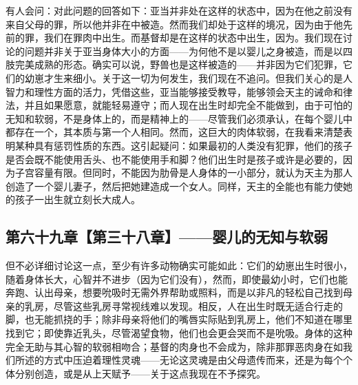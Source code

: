 有人会问：对此问题的回答如下：亚当并非处在这样的状态中，因为在他之前没有来自父母的罪，所以他并非在中被造。然而我们却处于这样的境况，因为由于他先前的罪，我们在罪肉中出生。而基督却是在这样的状态中出生，因为。我们现在讨论的问题并非关于亚当身体大小的方面——为何他不是以婴儿之身被造，而是以四肢完美成熟的形态。确实可以说，野兽也是这样被造的——并非因为它们犯罪，它们的幼崽才生来细小。关于这一切为何发生，我们现在不追问。但我们关心的是人智力和理性方面的活力，凭借这些，亚当能够接受教导，能够领会天主的诫命和律法，并且如果愿意，就能轻易遵守；而人现在出生时却完全不能做到，由于可怕的无知和软弱，不是身体上的，而是精神上的——尽管我们必须承认，在每个婴儿中都存在一个，其本质与第一个人相同。然而，这巨大的肉体软弱，在我看来清楚表明某种具有惩罚性质的东西。这引起疑问：如果最初的人类没有犯罪，他们的孩子是否会既不能使用舌头、也不能使用手和脚？他们出生时是孩子或许是必要的，因为子宫容量有限。但同时，不能因为肋骨是人身体的一小部分，就认为天主为那人创造了一个婴儿妻子，然后把她建造成一个女人。同样，天主的全能也有能力使她的孩子一出生就立刻长大成人。\par


\subsection{第六十九章【第三十八章】——婴儿的无知与软弱}

但不必详细讨论这一点，至少有许多动物确实可能如此：它们的幼崽出生时很小，随着身体长大，心智并不进步（因为它们没有），然而，即使最幼小时，它们也能奔跑、认出母亲，想要吮吸时无需外界帮助或照料，而是以非凡的轻松自己找到母亲的乳房，尽管这些乳房寻常视线难以发现。相反，人在出生时既无适合行走的脚，也无能抓挠的手；除非母亲将他们的嘴唇实际贴到乳房上，他们不知道在哪里找到它；即使靠近乳头，尽管渴望食物，他们也会更会哭而不是吮吸。身体的这种完全无助与其心智的软弱相吻合；基督的肉身也不会成为，除非那罪恶肉身在如我们所述的方式中压迫着理性灵魂——无论这灵魂是由父母遗传而来，还是为每个个体分别创造，或是从上天赋予——关于这点我现在不予探究。\par


